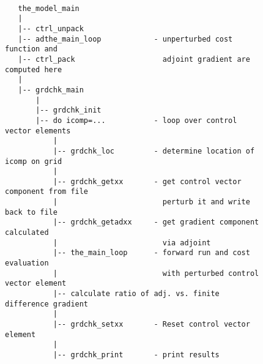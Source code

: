 \begin{figure}[!ht]

{\scriptsize
\begin{verbatim}

   the_model_main
   |
   |-- ctrl_unpack
   |-- adthe_main_loop            - unperturbed cost function and
   |-- ctrl_pack                    adjoint gradient are computed here
   |
   |-- grdchk_main
       |
       |-- grdchk_init
       |-- do icomp=...           - loop over control vector elements
           |
           |-- grdchk_loc         - determine location of icomp on grid
           |
           |-- grdchk_getxx       - get control vector component from file
           |                        perturb it and write back to file
           |-- grdchk_getadxx     - get gradient component calculated 
           |                        via adjoint
           |-- the_main_loop      - forward run and cost evaluation
           |                        with perturbed control vector element
           |-- calculate ratio of adj. vs. finite difference gradient
           |
           |-- grdchk_setxx       - Reset control vector element
           |
           |-- grdchk_print       - print results

\end{verbatim}
}

\caption{~}
\label{fig:grdchkflow}
\end{figure}
